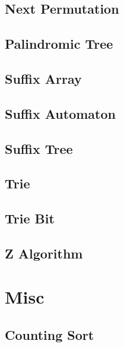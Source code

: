 \subsection{Next Permutation}
\raggedbottom
\hrulefill
\subsection{Palindromic Tree}
\raggedbottom
\hrulefill
\subsection{Suffix Array}
\raggedbottom
\hrulefill
\subsection{Suffix Automaton}
\raggedbottom
\hrulefill
\subsection{Suffix Tree}
\raggedbottom
\hrulefill
\subsection{Trie}
\raggedbottom
\hrulefill
\subsection{Trie Bit}
\raggedbottom
\hrulefill
\subsection{Z Algorithm}
\raggedbottom
\hrulefill

\section{Misc}
\subsection{Counting Sort}
\raggedbottom
\hrulefill

